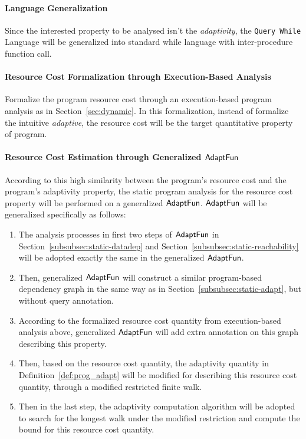 \paragraph*{Language Generalization} Since the interested property 
to be analysed isn't the \emph{adaptivity},
the {\tt Query While} Language will be generalized into standard while language with inter-procedure function call.
\paragraph*{Resource Cost Formalization through Execution-Based Analysis} 
Formalize the program resource cost through an execution-based program analysis as in Section~\ref{sec:dynamic}.
In this formalization, instead of formalize the intuitive \emph{adaptive}, the resource cost will be the
target quantitative property of program.
\paragraph*{Resource Cost Estimation through Generalized $\textsf{AdaptFun}$}
According to this high similarity between the program's resource cost and the 
program's adaptivity property, the static program analysis for the resource cost property will 
be performed on a generalized  $\textsf{AdaptFun}$.  $\textsf{AdaptFun}$ will be generalized specifically as follows:
\begin{enumerate}
    \item The analysis processes in first two steps of $\textsf{AdaptFun}$ in Section~\ref{subsubsec:static-datadep}
    and Section~\ref{subsubsec:static-reachability} will be adopted exactly the same in the generalized $\textsf{AdaptFun}$.
    \item Then, generalized $\textsf{AdaptFun}$ will construct a similar program-based dependency graph 
    in the same way as in Section~\ref*{subsubsec:static-adapt}, but without query annotation. 
    \item According to the formalized resource cost quantity from execution-based analysis above,
    generalized $\textsf{AdaptFun}$ will add extra annotation on this graph describing this property.
    \item Then, based on the resource cost quantity, the adaptivity quantity in Definition~\ref{def:prog_adapt}
    will be modified for describing this resource cost quantity, through a modified restricted finite walk.
    \item Then in the last step, the adaptivity computation algorithm will be adopted to search for the longest 
    walk under the modified restriction and compute the bound for 
    this resource cost quantity.
\end{enumerate}


